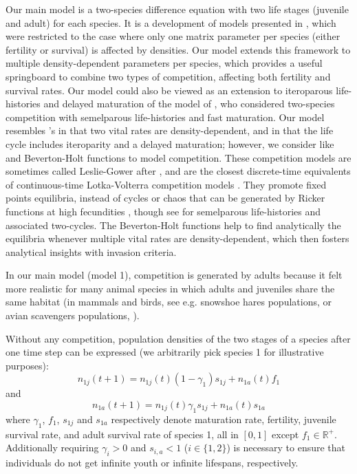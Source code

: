\documentclass{article}
\begin{document}
Our main model is a two-species difference equation with two life stages (juvenile and adult) for each species. It is a development of models presented in \citet{fujiwara2011coexistence}, which were restricted to the case where only one matrix parameter per species (either fertility or survival) is affected by densities. Our model extends this framework to multiple density-dependent parameters per species, which provides a useful springboard to combine two types of competition, affecting both fertility and survival rates. Our model could also be viewed as an extension to iteroparous life-histories and delayed maturation of the model of \citet{cushing2007coexistence}, who considered two-species competition with semelparous life-histories and fast maturation. Our model resembles \citet{moll2008competition}'s in that two vital rates are density-dependent, and in that the life cycle includes iteroparity and a delayed maturation; however, we consider like \citet{fujiwara2011coexistence} and \citet{cushing2007coexistence} Beverton-Holt functions to model competition. These competition models are sometimes called Leslie-Gower after \citet{leslie1958properties}, and are the closest discrete-time equivalents of continuous-time Lotka-Volterra competition models \citep{cushing2004some}. They promote fixed points equilibria, instead of cycles or chaos that can be generated by Ricker functions at high fecundities \citep{neubert2000density}, though see \citet{cushing2007coexistence} for semelparous life-histories and associated two-cycles. The Beverton-Holt functions help to find analytically the equilibria whenever multiple vital rates are density-dependent, which then fosters analytical insights with invasion criteria. 

In our main model (model 1), competition is generated by adults because it felt more realistic for many animal species in which adults and juveniles share the same habitat (in mammals and birds, see e.g. snowshoe hares populations, \citealp{boutin1984effect} or avian scavengers populations, \citealp{wallace1987competitive}). 

Without any competition, population densities of the two stages of a species after one time step can be expressed (we arbitrarily pick species 1 for illustrative purposes):
\begin{equation}
    n_{1j}(t+1) = n_{1j}(t) (1-\gamma_1)s_{1j} + n_{1a}(t) f_{1}
\end{equation}
and 
\begin{equation}
    n_{1a}(t+1) = n_{1j}(t) \gamma_1 s_{1j} + n_{1a}(t) s_{1a}
\end{equation}
where $\gamma_1$, $f_1$, $s_{1j}$ and $s_{1a}$ respectively denote maturation rate, fertility, juvenile survival rate, and adult survival rate of species 1, all in $[0,1]$ except $f_1 \in \mathbb{R}^{+}$.  Additionally requiring $\gamma_i>0$ and $s_{i,a}<1$ ($i \in \{1,2\}$) is necessary to ensure that individuals do not get infinite youth or infinite lifespans, respectively.
\end{document}
